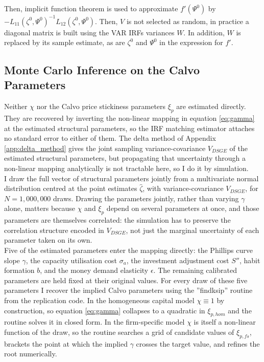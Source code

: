 \documentclass[12pt, a4paper]{article}
\begin{document}
\begin{appendices}
Then, implicit function theorem is used to approximate $f'(\Psi^0)$ by $-L_{11}(\zeta^0,\Psi^0)^{-1}L_{12}(\zeta^0,\Psi^0)$.
Then, $V$ is not selected as random, in practice a diagonal matrix is built using the VAR IRFs variances $W$.
In addition, $W$ is replaced by its sample estimate, as are $\zeta^0$ and $\Psi^0$ in the expression for $f'$.

\clearpage

\subsection{Monte Carlo Inference on the Calvo Parameters}
\label{app:montecalvo}

Neither $\chi$ nor the Calvo price stickiness parameters $\xi_p$ are estimated directly. They
are recovered by inverting the non-linear mapping in equation \eqref{eq:gamma} at the estimated
structural parameters, so the IRF matching estimator attaches no standard error to either of
them. The delta method of Appendix \ref{app:delta_method} gives the joint sampling variance-covariance
$V_{DSGE}$ of the estimated structural parameters, but propagating that uncertainty through a
non-linear mapping analytically is not tractable here, so I do it by simulation.
\\

I draw the full vector of structural parameters jointly from a multivariate normal distribution
centred at the point estimates $\hat{\zeta}$, with variance-covariance $V_{DSGE}$, for $N = 1{,}000{,}000$
draws. Drawing the parameters jointly, rather than varying $\gamma$ alone, matters because
$\chi$ and $\xi_p$ depend on several parameters at once, and those parameters are themselves
correlated: the simulation has to preserve the correlation structure encoded in $V_{DSGE}$, not
just the marginal uncertainty of each parameter taken on its own.
\\

Five of the estimated parameters enter the mapping directly: the Phillips curve slope $\gamma$,
the capacity utilisation cost $\sigma_a$, the investment adjustment cost $S''$, habit formation
$b$, and the money demand elasticity $\epsilon$. The remaining calibrated parameters are held
fixed at their original values. For every draw of these five parameters I recover the implied
Calvo parameters using the ''findksip'' routine from the \citet{ACEL2005WP} replication
code. In the homogeneous capital model $\chi \equiv 1$ by construction, so equation
\eqref{eq:gamma} collapses to a quadratic in $\xi_{p,hom}$ and the routine solves it in closed
form. In the firm-specific model $\chi$ is itself a non-linear function of the draw, so the
routine searches a grid of candidate values of $\xi_{p,fs}$, brackets the point at which the
implied $\gamma$ crosses the target value, and refines the root numerically.
\\


\end{appendices}
\end{document}
